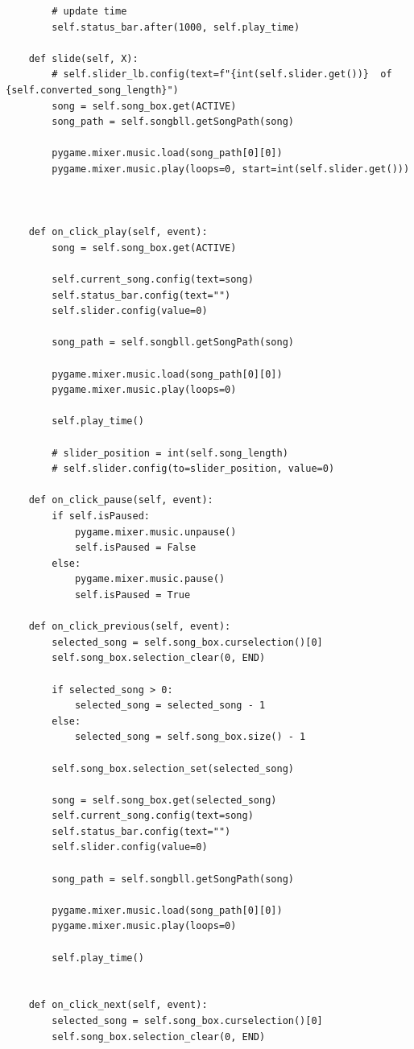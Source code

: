 \documentclass[a4paper]{article}
\begin{document}
\begin{mdframed}[hidealllines=true,backgroundcolor=magenta!10]
\begin{lstlisting}
        # update time 
        self.status_bar.after(1000, self.play_time)

    def slide(self, X):
        # self.slider_lb.config(text=f"{int(self.slider.get())}  of  {self.converted_song_length}")
        song = self.song_box.get(ACTIVE)
        song_path = self.songbll.getSongPath(song)

        pygame.mixer.music.load(song_path[0][0])
        pygame.mixer.music.play(loops=0, start=int(self.slider.get()))



    def on_click_play(self, event):
        song = self.song_box.get(ACTIVE)

        self.current_song.config(text=song)
        self.status_bar.config(text="")
        self.slider.config(value=0)

        song_path = self.songbll.getSongPath(song)

        pygame.mixer.music.load(song_path[0][0])
        pygame.mixer.music.play(loops=0)

        self.play_time()

        # slider_position = int(self.song_length)
        # self.slider.config(to=slider_position, value=0)

    def on_click_pause(self, event):
        if self.isPaused:
            pygame.mixer.music.unpause()
            self.isPaused = False
        else:
            pygame.mixer.music.pause()
            self.isPaused = True

    def on_click_previous(self, event):
        selected_song = self.song_box.curselection()[0]
        self.song_box.selection_clear(0, END)

        if selected_song > 0:
            selected_song = selected_song - 1
        else:
            selected_song = self.song_box.size() - 1

        self.song_box.selection_set(selected_song)

        song = self.song_box.get(selected_song)
        self.current_song.config(text=song)
        self.status_bar.config(text="")
        self.slider.config(value=0)

        song_path = self.songbll.getSongPath(song)

        pygame.mixer.music.load(song_path[0][0])
        pygame.mixer.music.play(loops=0)

        self.play_time()


    def on_click_next(self, event):
        selected_song = self.song_box.curselection()[0]
        self.song_box.selection_clear(0, END)


\end{lstlisting}
\end{mdframed}
\end{document}
